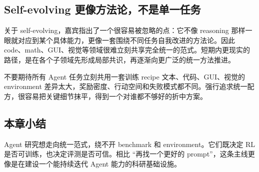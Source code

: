 \subsection{Self-evolving 更像方法论，不是单一任务}
关于 self-evolving，嘉宾指出了一个很容易被忽略的点：它不像 reasoning 那样一眼就对应到某个具体能力，更像一套围绕不同任务自我改进的方法论。因此 code、math、GUI、视觉等领域很难立刻共享完全统一的范式。短期内更现实的路径，是在各个子领域先形成局部共识，再逐渐向更广泛的统一方法推进。

\begin{warningbox}{不要期待所有 Agent 任务立刻共用一套训练 recipe}
文本、代码、GUI、视觉的 environment 差异太大，奖励密度、行动空间和失败模式都不同。强行追求统一配方，很容易把关键细节抹平，得到一个对谁都不够好的折中方案。
\end{warningbox}

\subsection{本章小结}
Agent 研究想走向统一范式，绕不开 benchmark 和 environment。它们既决定 RL 是否可训练，也决定评测是否可信。相比 ``再找一个更好的 prompt''，这条主线更像是在建设一个能持续迭代 Agent 能力的科研基础设施。

